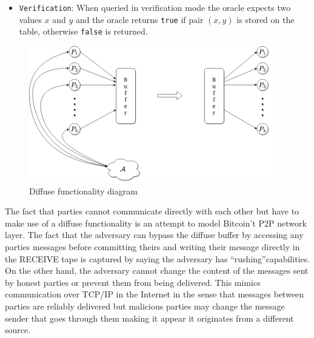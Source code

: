 \documentclass[..]{subfiles}
\begin{document}
\begin{itemize}
\begin{itemize}
		\item \texttt{Verification}: When queried in verification mode the oracle expects two values $x$ and $y$ and the oracle returns \texttt{true} if pair $(x, y)$ is stored on the table, otherwise \texttt{false} is returned.
	\end{itemize}
\end{itemize}


\begin{figure}
	\begin{center}
		\includegraphics[width=0.95\textwidth]{figures/diffuse_diagram.png}
	\end{center}
	\caption{Diffuse functionality diagram}
	\label{fig:diffuse}
\end{figure}

The fact that parties cannot communicate directly with each other but have to make use of a diffuse functionality is an attempt to model Bitcoin't P2P network layer. The fact that the adversary can bypass the diffuse buffer by accessing any parties messages before committing theirs and writing their message directly in the RECEIVE tape is captured by saying the adversary has ``rushing''\footnotemark capabilities. On the other hand, the adversary cannot change the content of the messages sent by honest parties or prevent them from being delivered. This mimics communication over TCP/IP in the Internet in the sense that messages between parties are reliably delivered but malicious parties may change the message sender that goes through them making it appear it originates from a different source.
\end{document}
